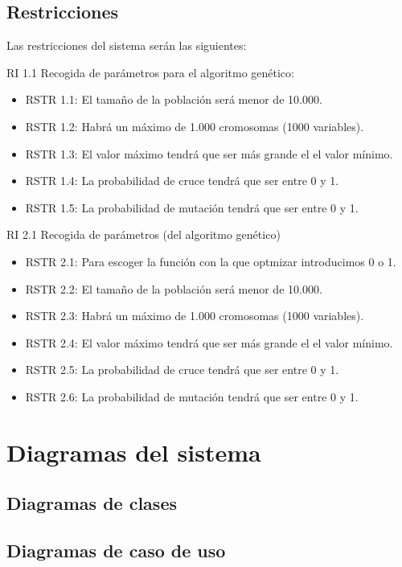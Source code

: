 \subsection{Restricciones}

\bigskip
Las restricciones del sistema serán las siguientes:

\bigskip
RI 1.1 Recogida de parámetros para el algoritmo genético:

\begin{itemize}
	\item RSTR 1.1: El tamaño de la población será menor de 10.000.
	\item RSTR 1.2: Habrá un máximo de 1.000 cromosomas (1000 variables).
	\item RSTR 1.3: El valor máximo tendrá que ser más grande el el valor mínimo.
	\item RSTR 1.4: La probabilidad de cruce tendrá que ser entre 0 y 1.
	\item RSTR 1.5: La probabilidad de mutación tendrá que ser entre 0 y 1.
\end{itemize}


\bigskip
RI 2.1 Recogida de parámetros (del algoritmo genético)
\begin{itemize}
	\item RSTR 2.1: Para escoger la función con la que optmizar introducimos 0 o 1.
	\item RSTR 2.2: El tamaño de la población será menor de 10.000.
	\item RSTR 2.3: Habrá un máximo de 1.000 cromosomas (1000 variables).
	\item RSTR 2.4: El valor máximo tendrá que ser más grande el el valor mínimo.
	\item RSTR 2.5: La probabilidad de cruce tendrá que ser entre 0 y 1.
	\item RSTR 2.6: La probabilidad de mutación tendrá que ser entre 0 y 1.
\end{itemize}

\newpage
\section{Diagramas del sistema}

\subsection{Diagramas de clases}

\subsection{Diagramas de caso de uso}






